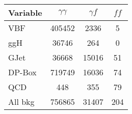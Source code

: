 \documentclass[a4paper,portrait]{article}
\begin{document}
\begin{center}
\begin{tabular}{| l || c | c | c |}
\hline
Variable & $\gamma\gamma$ & $\gamma{f}$ & $ff$ \\ \hline
VBF & 405452 &  2336 &     5 \\ 
ggH & 36746 &   264 &     0 \\ 
GJet & 36668 & 15016 &    51 \\ 
DP-Box & 719749 & 16036 &    74 \\ 
QCD &   448 &   355 &    79 \\ 
All bkg & 756865 & 31407 &   204 \\ 
\hline
\end{tabular}
\end{center}
\end{document}
